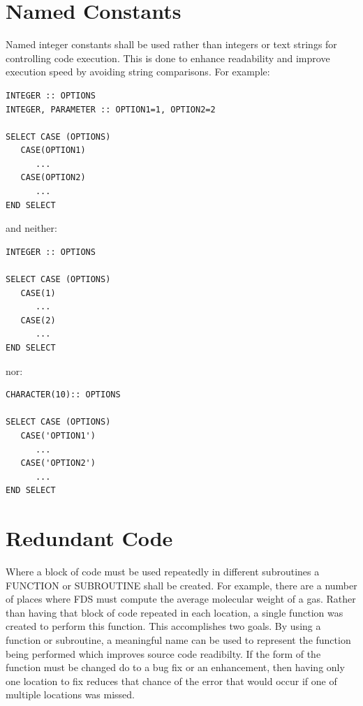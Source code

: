 \documentclass[11pt]{book}
\newcommand{\nopart}{\expandafter\def\csname Parent-1\endcsname{}} %
\begin{document}
\section{Named Constants}

Named integer constants shall be used rather than integers or text strings for controlling code execution.  This
is done to enhance readability and improve execution speed by avoiding string comparisons.  For example:

\begin{verbatim}
INTEGER :: OPTIONS
INTEGER, PARAMETER :: OPTION1=1, OPTION2=2

SELECT CASE (OPTIONS) 
   CASE(OPTION1)
      ...
   CASE(OPTION2)
      ...
END SELECT
\end{verbatim}

and neither:
\begin{verbatim}
INTEGER :: OPTIONS

SELECT CASE (OPTIONS) 
   CASE(1)
      ...
   CASE(2)
      ...
END SELECT
\end{verbatim}

nor:
\begin{verbatim}
CHARACTER(10):: OPTIONS

SELECT CASE (OPTIONS) 
   CASE('OPTION1')
      ...
   CASE('OPTION2')
      ...
END SELECT
\end{verbatim}

\section{Redundant Code}

Where a block of code must be used repeatedly in different subroutines a {\ct FUNCTION} or {\ct SUBROUTINE}
shall be created.  For example, there are a number of places where FDS must compute the average molecular weight
of a gas.  Rather than having that block of code repeated in each location, a single function was created to
perform this function.  This accomplishes two goals.  By using a function or subroutine, a meaningful name can
be used to represent the function being performed which improves source code readibilty.  If the form of the
function must be changed do to a bug fix or an enhancement, then having only one location to fix reduces that
chance of the error that would occur if one of multiple locations was missed.

\backmatter
\nopart



\printindex
\end{document}
